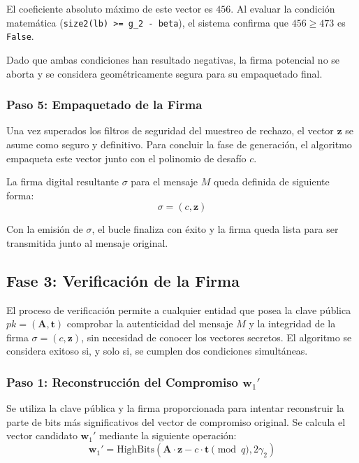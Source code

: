 \documentclass[11pt, a4paper]{report}
\theoremstyle{definition}
\begin{document}
El coeficiente absoluto máximo de este vector es $456$. Al evaluar la condición matemática (\texttt{size2(lb) >= g\_2 - beta}), el sistema confirma que $456 \ge 473$ es \texttt{False}.

Dado que ambas condiciones han resultado negativas, la firma potencial no se aborta y se considera geométricamente segura para su empaquetado final.


\subsubsection*{Paso 5: Empaquetado de la Firma}

Una vez superados los filtros de seguridad del muestreo de rechazo, el vector $\mathbf{z}$ se asume como seguro y definitivo. Para concluir la fase de generación, el algoritmo empaqueta este vector junto con el polinomio de desafío $c$. 

La firma digital resultante $\sigma$ para el mensaje $M$ queda definida de siguiente forma:
\begin{equation}
    \sigma = (c, \mathbf{z})
\end{equation}

Con la emisión de $\sigma$, el bucle finaliza con éxito y la firma queda lista para ser transmitida junto al mensaje original.


\subsection{Fase 3: Verificación de la Firma}

El proceso de verificación permite a cualquier entidad que posea la clave pública $pk = (\mathbf{A}, \mathbf{t})$ comprobar la autenticidad del mensaje $M$ y la integridad de la firma $\sigma = (c, \mathbf{z})$, sin necesidad de conocer los vectores secretos. El algoritmo se considera exitoso si, y solo si, se cumplen dos condiciones simultáneas.

\subsubsection*{Paso 1: Reconstrucción del Compromiso $\mathbf{w}_1'$}
Se utiliza la clave pública y la firma proporcionada para intentar reconstruir la parte de bits más significativos del vector de compromiso original. Se calcula el vector candidato $\mathbf{w}_1'$ mediante la siguiente operación:
\begin{equation}
    \mathbf{w}_1' = \text{HighBits}(\mathbf{A} \cdot \mathbf{z} - c \cdot \mathbf{t} \pmod{q}, 2\gamma_2)
\end{equation}
\end{document}
